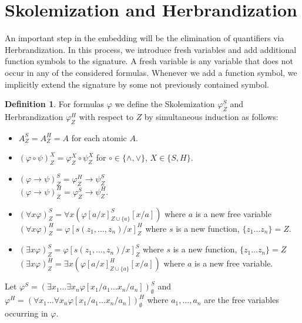 \documentclass[a4paper,11pt]{report}
\theoremstyle{definition}
\theoremstyle{definition}
\theoremstyle{definition}
\theoremstyle{definition}
\theoremstyle{definition}
\newtheorem{definition}[theorem]{Definition}
\theoremstyle{definition}
\theoremstyle{definition}
\begin{document}
	\section{Skolemization and Herbrandization}
	
	An important step in the embedding will be the elimination of quantifiers via Herbrandization.
	In this process, we introduce fresh variables and add additional function symbols to the signature.
	A fresh variable is any variable that does not occur in any of the considered formulas.
	Whenever we add a function symbol, we implicitly extend the signature by some not previously contained symbol.
	
	\begin{definition}
		For formulas $\varphi$ we define the Skolemization $\varphi^S_Z$ and Herbrandization $\varphi^H_Z$ with respect to $Z$ by simultaneous induction as follows:
		\begin{itemize}
			\item $A^S_Z = A^H_Z = A$ for each atomic $A$.
			\item $(\varphi\circ\psi)^X_Z = \varphi^X_Z\circ\psi^X_Z$ for $\circ\in\{\wedge, \vee\}$, $X\in\{S, H\}$.
			\item $(\varphi\to\psi)^S_Z = \varphi^H_Z\to \psi^S_Z$\\$(\varphi\to\psi)^H_Z = \varphi^S_Z\to\psi^H_Z$.
			\item $(\forall x\varphi)^S_Z = \forall x(\varphi[a/x]^S_{Z\cup\{a\}}[x/a])$ where $a$ is a new free variable\\$(\forall x\varphi)^H_Z = \varphi[s(z_1,\dots,z_n)/x]^H_Z$ where $s$ is a new function, $\{z_1\dots z_n\} = Z$.
			\item $(\exists x\varphi)^S_Z = \varphi[s(z_1,\dots,z_n)/x]^S_Z$ where $s$ is a new function, $\{z_1\dots z_n\} = Z$\\$(\exists x\varphi)^H_Z = \exists x(\varphi[a/x]^H_{Z\cup\{a\}}[x/a])$ where $a$ is a new free variable.
		\end{itemize}
		Let $\varphi^S = (\exists x_1\dots\exists x_n \varphi[x_1/a_1\dots x_n/a_n])^S_\emptyset$ and $\varphi^H = (\forall x_1\dots\forall x_n \varphi[x_1/a_1\dots x_n/a_n])^H_\emptyset$ where $a_1,\dots,a_n$ are the free variables occurring in $\varphi$.
	\end{definition}
	
\end{document}
